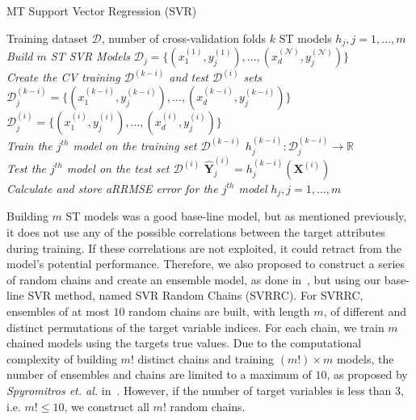 \documentclass[preprint,12pt]{elsarticle}
\begin{document}
\begin{algorithm}[t!]
\caption{MT Support Vector Regression (SVR)}
\label{alg:SVR} 
\begin{algorithmic}[1]
\renewcommand{\algorithmicrequire}{\textbf{Input:}}
\renewcommand{\algorithmicensure}{\textbf{Output:}}
\REQUIRE Training dataset $\mathcal{D}$, number of cross-validation folds $k$
\ENSURE  ST models $h_j, j = 1,\ldots,m$
\\ \textit{Build $m$ ST SVR Models}
\STATE $\mathcal{D}_j = \{(x_1^{(1)},y_j^{(1)}), \ldots, (x_d^{(\mathcal N)},y_j^{(\mathcal N)})\}$
\\ \textit{Create the CV training $\mathcal{D}^{(k-i)}$ and test $\mathcal{D}^{(i)}$ sets}
\STATE $\mathcal{D}_j^{(k-i)} = \{(x_1^{(k-i)},y_j^{(k-i)}), \ldots, (x_d^{(k-i)},y_j^{(k-i)})\}$ 
\STATE $\mathcal{D}_j^{(i)} = \{(x_1^{(i)},y_j^{(i)}), \ldots, (x_d^{(i)},y_j^{(i)})\}$ 
\\ \textit{Train the $j^{th}$ model on the training set $\mathcal{D}^{(k-i)}$}
\STATE $h_j^{(k-i)} : \mathcal{D}_j^{(k-i)} \rightarrow \mathbb{R}$
\\ \textit{Test the $j^{th}$ model on the test set $\mathcal{D}^{(i)}$}
\STATE $\hat{\bm Y}_j^{(i)} = h_j^{(k-i)}(\bm X^{(i)})$
\ENDFOR
\\ \textit{Calculate and store aRRMSE error for the $j^{th}$ model}
\ENDFOR
\RETURN $h_j, j=1,\ldots,m$ 
\end{algorithmic} 
\end{algorithm}

Building $m$ ST models was a good base-line model, but as mentioned previously, it does not use any of the possible correlations between the target attributes during training. If these correlations are not exploited, it could retract from the model's potential performance. Therefore, we also proposed to construct a series of random chains and create an ensemble model, as done in~\cite{Spyromitros2014}, but using our base-line SVR method, named SVR Random Chains (SVRRC). For SVRRC, ensembles of at most $10$ random chains are built, with length $m$, of different and distinct permutations of the target variable indices. For each chain, we train $m$ chained models using the targets true values. Due to the computational complexity of building $m!$ distinct chains and training $\left(m!\right) \times m$ models, the number of ensembles and chains are limited to a maximum of $10$, as proposed by \textit{Spyromitros et. al.} in~\cite{Spyromitros2014}. However, if the number of target variables is less than $3$, i.e. $m! \leq 10$, we construct all $m!$ random chains.
\end{document}
